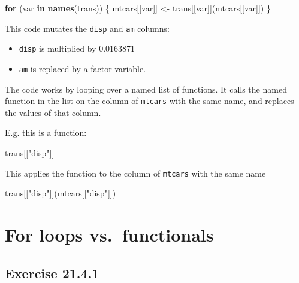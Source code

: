 \documentclass[]{book}
\newenvironment{Shaded}{\begin{snugshade}}{\end{snugshade}}
\newcommand{\ControlFlowTok}[1]{\textcolor[rgb]{0.13,0.29,0.53}{\textbf{#1}}}
\newcommand{\KeywordTok}[1]{\textcolor[rgb]{0.13,0.29,0.53}{\textbf{#1}}}
\newcommand{\NormalTok}[1]{#1}
\newcommand{\StringTok}[1]{\textcolor[rgb]{0.31,0.60,0.02}{#1}}
\providecommand{\tightlist}{%
  \setlength{\itemsep}{0pt}\setlength{\parskip}{0pt}}
\theoremstyle{plain}
\theoremstyle{remark}
\begin{document}
\begin{Shaded}
\begin{Highlighting}[]
\ControlFlowTok{for}\NormalTok{ (var }\ControlFlowTok{in} \KeywordTok{names}\NormalTok{(trans)) \{}
\NormalTok{  mtcars[[var]] <-}\StringTok{ }\NormalTok{trans[[var]](mtcars[[var]])}
\NormalTok{\}}
\end{Highlighting}
\end{Shaded}

This code mutates the \texttt{disp} and \texttt{am} columns:

\begin{itemize}
\tightlist
\item
  \texttt{disp} is multiplied by 0.0163871
\item
  \texttt{am} is replaced by a factor variable.
\end{itemize}

The code works by looping over a named list of functions. It calls the
named function in the list on the column of \texttt{mtcars} with the
same name, and replaces the values of that column.

E.g. this is a function:

\begin{Shaded}
\begin{Highlighting}[]
\NormalTok{trans[[}\StringTok{"disp"}\NormalTok{]]}
\end{Highlighting}
\end{Shaded}

This applies the function to the column of \texttt{mtcars} with the same
name

\begin{Shaded}
\begin{Highlighting}[]
\NormalTok{trans[[}\StringTok{"disp"}\NormalTok{]](mtcars[[}\StringTok{"disp"}\NormalTok{]])}
\end{Highlighting}
\end{Shaded}

\hypertarget{for-loops-vs.functionals}{%
\section{For loops vs.~functionals}\label{for-loops-vs.functionals}}

\hypertarget{exercise-21.4.1}{%
\subsection*{\texorpdfstring{Exercise
{21.4.1}}{Exercise 21.4.1}}\label{exercise-21.4.1}}
\end{document}
